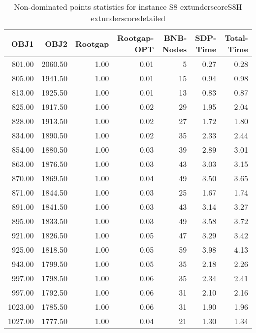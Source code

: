 \begin{table}
\caption{Non-dominated points statistics for instance S8	extunderscoreS8H	extunderscoredetailed}
\label{tab:stats/S8_S8H_detailed}
\begin{tabular}{rrrrrrr}
\toprule
OBJ1 & OBJ2 & Rootgap & Rootgap-OPT & BNB-Nodes & SDP-Time & Total-Time \\
\midrule
801.00 & 2060.50 & 1.00 & 0.01 & 5 & 0.27 & 0.28 \\
805.00 & 1941.50 & 1.00 & 0.01 & 15 & 0.94 & 0.98 \\
813.00 & 1925.50 & 1.00 & 0.01 & 13 & 0.83 & 0.87 \\
825.00 & 1917.50 & 1.00 & 0.02 & 29 & 1.95 & 2.04 \\
828.00 & 1913.50 & 1.00 & 0.02 & 27 & 1.72 & 1.80 \\
834.00 & 1890.50 & 1.00 & 0.02 & 35 & 2.33 & 2.44 \\
854.00 & 1880.50 & 1.00 & 0.03 & 39 & 2.89 & 3.01 \\
863.00 & 1876.50 & 1.00 & 0.03 & 43 & 3.03 & 3.15 \\
870.00 & 1869.50 & 1.00 & 0.04 & 49 & 3.50 & 3.65 \\
871.00 & 1844.50 & 1.00 & 0.03 & 25 & 1.67 & 1.74 \\
891.00 & 1841.50 & 1.00 & 0.03 & 43 & 3.14 & 3.27 \\
895.00 & 1833.50 & 1.00 & 0.03 & 49 & 3.58 & 3.72 \\
921.00 & 1826.50 & 1.00 & 0.05 & 47 & 3.29 & 3.42 \\
925.00 & 1818.50 & 1.00 & 0.05 & 59 & 3.98 & 4.13 \\
943.00 & 1799.50 & 1.00 & 0.05 & 35 & 2.18 & 2.26 \\
997.00 & 1798.50 & 1.00 & 0.06 & 35 & 2.34 & 2.41 \\
997.00 & 1792.50 & 1.00 & 0.06 & 31 & 2.10 & 2.16 \\
1023.00 & 1785.50 & 1.00 & 0.06 & 31 & 1.90 & 1.96 \\
1027.00 & 1777.50 & 1.00 & 0.04 & 21 & 1.30 & 1.34 \\
\bottomrule
\end{tabular}
\end{table}
